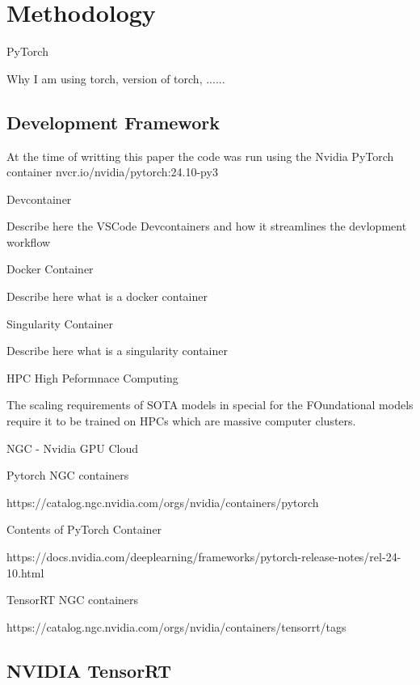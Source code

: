 \documentclass{article}
\begin{document}
\section{Methodology}

PyTorch

Why I am using torch, version of torch, ......

\subsection{Development Framework}

At the time of writting this paper the code was run using the Nvidia PyTorch container nvcr.io/nvidia/pytorch:24.10-py3

Devcontainer

Describe here the VSCode Devcontainers and how it streamlines the devlopment workflow

Docker Container

Describe here what is a docker container

Singularity Container

Describe here what is a singularity container

HPC High Peformnace Computing

The scaling requirements of SOTA models in special for the FOundational models require it to be trained on HPCs which are massive computer clusters.

NGC - Nvidia GPU Cloud

Pytorch NGC containers

https://catalog.ngc.nvidia.com/orgs/nvidia/containers/pytorch

Contents of PyTorch Container

https://docs.nvidia.com/deeplearning/frameworks/pytorch-release-notes/rel-24-10.html

TensorRT NGC containers

https://catalog.ngc.nvidia.com/orgs/nvidia/containers/tensorrt/tags

\subsection{NVIDIA TensorRT}
\end{document}
